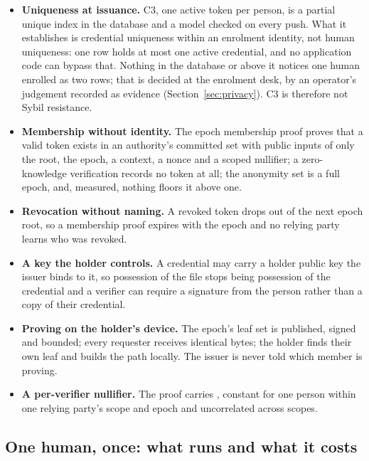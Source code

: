\begin{itemize}
  \item \textbf{Uniqueness at issuance.} C3, one active token per person, is a partial unique index
    in the database and a model checked on every push. What it establishes is
    credential uniqueness within an enrolment identity, not human uniqueness: one 
    row holds at most one active credential, and no application code can bypass that. Nothing in
    the database or above it notices one human enrolled as two rows; that is decided at the
    enrolment desk, by an operator's judgement recorded as evidence (Section~\ref{sec:privacy}).
    C3 is therefore not Sybil resistance. \sImpl
  \item \textbf{Membership without identity.} The epoch membership proof proves that a valid token
    exists in an authority's committed set with public inputs of only the root, the epoch, a context,
    a nonce and a scoped nullifier; a zero-knowledge verification records no token at all; the
    anonymity set is a full epoch, and, measured, nothing floors it above one. \sImpl
  \item \textbf{Revocation without naming.} A revoked token drops out of the next epoch root, so a
    membership proof expires with the epoch and no relying party learns who was revoked. \sImpl
  \item \textbf{A key the holder controls.} A credential may carry a holder public key the issuer
    binds to it, so possession of the file stops being possession of the credential and a verifier
    can require a signature from the person rather than a copy of their credential. \sImpl
  \item \textbf{Proving on the holder's device.} The epoch's leaf set is published, signed and
    bounded; every requester receives identical bytes; the holder finds their own leaf and builds the
    path locally. The issuer is never told which member is proving. \sImpl
  \item \textbf{A per-verifier nullifier.} The proof carries
    , constant for one person within one relying
    party's scope and epoch and uncorrelated across scopes. \sImpl
\end{itemize}

\subsection{One human, once: what runs and what it costs}

